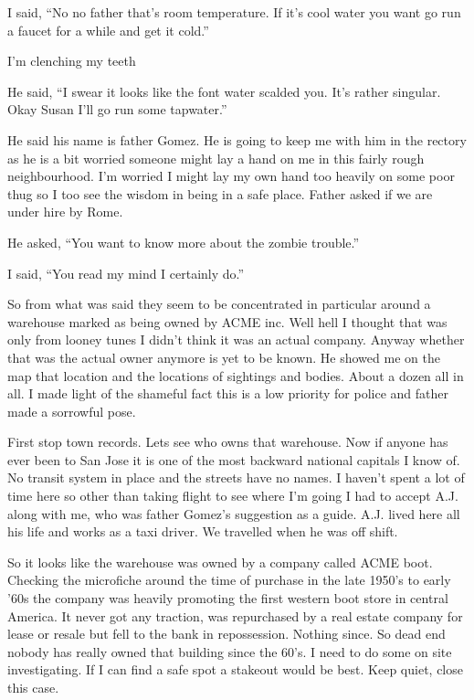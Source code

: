 I said, ``No no father that's room temperature. If it's cool water you want go run a faucet for a while and get it cold.''

I'm clenching my teeth

He said, ``I swear it looks like the font water scalded you. It's rather singular. Okay Susan I'll go run some tapwater.''

He said his name is father Gomez. He is going to keep me with him in the rectory as he is a bit worried someone might lay a hand on me in this fairly rough neighbourhood. I'm worried I might lay my own hand too heavily on some poor thug so I too see the wisdom in being in a safe place. Father asked if we are under hire by Rome. 

He asked, ``You want to know more about the zombie trouble.''

I said, ``You read my mind I certainly do.''

So from what was said they seem to be concentrated in particular around a warehouse marked as being owned by ACME inc. Well hell I thought that was only from looney tunes I didn't think it was an actual company. Anyway whether that was the actual owner anymore is yet to be known. He showed me on the map that location and the locations of sightings and bodies. About a dozen all in all. I made light of the shameful fact this is a low priority for police and father made a sorrowful pose.

First stop town records. Lets see who owns that warehouse. Now if anyone has ever been to San Jose it is one of the most backward national capitals I know of. No transit system in place and the streets have no names. I haven't spent a lot of time here so other than taking flight to see where I'm going I had to accept A.J. along with me, who was father Gomez's suggestion as a guide. A.J. lived here all his life and works as a taxi driver. We travelled when he was off shift.

So it looks like the warehouse was owned by a company called ACME boot. Checking the microfiche around the time of purchase in the late 1950's to early '60s the company was heavily promoting the first western boot store in central America. It never got any traction, was repurchased by a real estate company for lease or resale but fell to the bank in repossession. Nothing since. So dead end nobody has really owned that building since the 60's. 
I need to do some on site investigating. If I can find a safe spot a stakeout would be best. Keep quiet, close this case.

